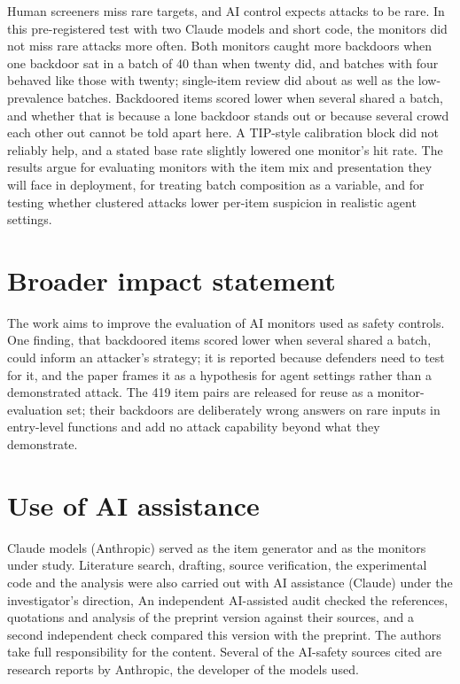 \documentclass[10pt]{article}
\begin{document}
Human screeners miss rare targets, and AI control expects attacks to be rare. In this pre-registered test with two Claude models and short code, the monitors did not miss rare attacks more often. Both monitors caught more backdoors when one backdoor sat in a batch of 40 than when twenty did, and batches with four behaved like those with twenty; single-item review did about as well as the low-prevalence batches. Backdoored items scored lower when several shared a batch, and whether that is because a lone backdoor stands out or because several crowd each other out cannot be told apart here. A TIP-style calibration block did not reliably help, and a stated base rate slightly lowered one monitor's hit rate. The results argue for evaluating monitors with the item mix and presentation they will face in deployment, for treating batch composition as a variable, and for testing whether clustered attacks lower per-item suspicion in realistic agent settings.

\section*{Broader impact statement}

The work aims to improve the evaluation of AI monitors used as safety controls. One finding, that backdoored items scored lower when several shared a batch, could inform an attacker's strategy; it is reported because defenders need to test for it, and the paper frames it as a hypothesis for agent settings rather than a demonstrated attack. The 419 item pairs are released for reuse as a monitor-evaluation set; their backdoors are deliberately wrong answers on rare inputs in entry-level functions and add no attack capability beyond what they demonstrate.

\section*{Use of AI assistance}

Claude models (Anthropic) served as the item generator and as the monitors under study. Literature search, drafting, source verification, the experimental code and the analysis were also carried out with AI assistance (Claude) under the investigator's direction, An independent AI-assisted audit checked the references, quotations and analysis of the preprint version against their sources, and a second independent check compared this version with the preprint. The authors take full responsibility for the content. Several of the AI-safety sources cited are research reports by Anthropic, the developer of the models used.
\end{document}
